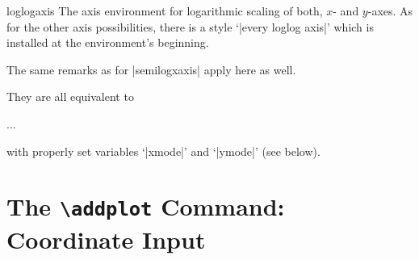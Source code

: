 \begin{environment}{{loglogaxis}}
    The axis environment for logarithmic scaling of both, $x$- and $y$-axes. As
    for the other axis possibilities, there is a style `|every loglog axis|'
    which is installed at the environment's beginning.

    The same remarks as for |semilogxaxis| apply here as well.
\end{environment}

\noindent They are all equivalent to
%
\begin{codeexample}
\begin{axis}[
    xmode=log|normal,
    ymode=log|normal]
    ...
\end{axis}
\end{codeexample}
%
\noindent with properly set variables `|xmode|' and `|ymode|' (see below).


\section{The \protect\texttt{\protect\textbackslash addplot} Command: Coordinate Input}
\label{sec:addplot}

